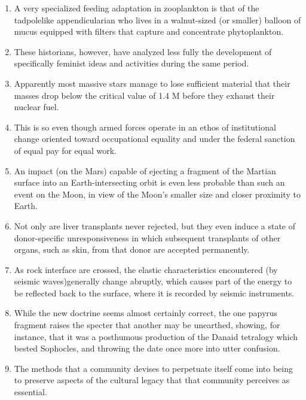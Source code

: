 \begin{enumerate}
\item A very specialized feeding adaptation in zooplankton is that of the tadpolelike appendicularian who lives in a walnut-sized (or smaller) balloon of mucus equipped with filters that capture and concentrate phytoplankton. 

\item These historians, however, have analyzed less fully the development of
specifically feminist ideas and activities during the same period. 

\item Apparently most massive stars manage to lose sufficient material that their
masses drop below the critical value of 1.4 M before they exhaust their nuclear fuel. 

\item This is so even though armed forces operate in an ethos of institutional change oriented toward occupational equality and under the federal sanction of equal pay for equal work.

\item An impact (on the Mars) capable of ejecting a fragment of the Martian                          
surface into an Earth-intersecting orbit is even less probable than such an event on the Moon, in view of the Moon's smaller size and closer proximity to Earth.

\item Not only are liver transplants never rejected, but they even induce a state
of donor-specific unresponsiveness in which subsequent transplants of other organs, such as skin, from that  donor are accepted permanently. 

\item As rock interface are crossed, the elastic characteristics encountered
(by seismic waves)generally change abruptly, which causes part of the energy to be reflected back to the surface, where it is recorded by seismic instruments. 

\item While the new doctrine seems almost certainly correct, the one papyrus fragment raises the specter that another may be unearthed, showing,  for instance, that it was a posthumous production of the Danaid tetralogy which bested Sophocles, and throwing the date once  more into utter confusion. 

\item The methods that a community devises to perpetuate itself come into being to preserve aspects of the cultural legacy that that community perceives as essential. 


\end{enumerate}
